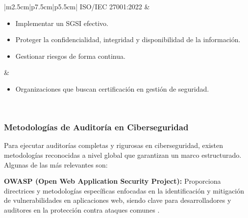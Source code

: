 \documentclass[a4paper, 11pt]{article}
\begin{document}
\begin{table}[H]
\begin{tabular}{|m{2.5cm}|p{7.5cm}|p{5.5cm}|}
ISO/IEC 27001:2022 &
\begin{minipage}[c]{\linewidth}
\begin{itemize} \par\vspace{0.1cm}
  \item Implementar un SGSI efectivo.    
  \item Proteger la confidencialidad, integridad y disponibilidad de la información.
  \item Gestionar riesgos de forma continua.    \par\vspace{0.1cm}

\end{itemize}
\end{minipage} &
\begin{minipage}[c]{\linewidth}
\begin{itemize}
  \item Organizaciones que buscan certificación en gestión de seguridad.
\end{itemize}
\end{minipage} \\ \hline

\end{tabular}
\caption{Comparativa de normativas y estándares en ciberseguridad.}
\label{tabla:normativas}
\end{table}





\par\vspace{0.5cm}


\subsubsection{Metodologías de Auditoría en Ciberseguridad}
\par\vspace{0.5cm}

Para ejecutar auditorías completas y rigurosas en ciberseguridad, existen metodologías reconocidas a nivel global que garantizan un marco estructurado. Algunas de las más relevantes son:
\par\vspace{0.5cm}

\textbf{OWASP (Open Web Application Security Project):} Proporciona directrices y metodologías específicas enfocadas en la identificación y mitigación de vulnerabilidades en aplicaciones web, siendo clave para desarrolladores y auditores en la protección contra ataques comunes \cite{owasp}.
\par\vspace{0.5cm}
\end{document}
